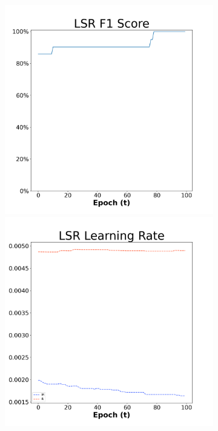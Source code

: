 \begin{figure}[H]
    \centering %
\begin{subfigure}{0.3\textwidth}
  \includegraphics[width=\linewidth]{images/exper2/Sonar/LSR_0.01_f1.png}
    \includegraphics[width=\linewidth]{images/exper2/Sonar/LSR_0.01_lr.png}

\end{subfigure}
\end{figure}
